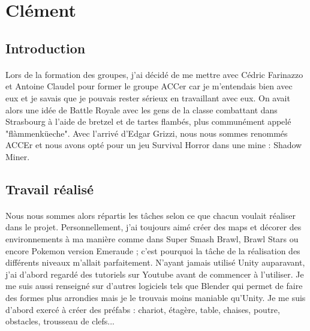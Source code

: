 \documentclass[titlepage, 13px, a4paper]{report}
\begin{document}
\newpage
\section{Clément}
\subsection{Introduction}
\paragraph*{} \hspace{0pt}
Lors de la formation des groupes, j'ai décidé de me mettre avec Cédric Farinazzo et Antoine Claudel 
pour former le groupe ACCer car je m'entendais bien avec eux et je savais que je pouvais rester 
sérieux en travaillant avec eux. On avait alors une idée de Battle Royale avec les gens de la 
classe combattant dans Strasbourg à l'aide de bretzel et de tartes flambés, plus communément 
appelé "flàmmenküeche". Avec l'arrivé d'Edgar Grizzi, nous nous sommes renommés ACCEr et nous 
avons opté pour un jeu Survival Horror dans une mine : Shadow Miner. \\

\subsection{Travail réalisé}
\paragraph*{} \hspace{0pt}
Nous nous sommes alors répartis les tâches selon ce que chacun voulait réaliser 
dans le projet. Personnellement, j'ai toujours aimé créer des maps et décorer 
des environnements à ma manière comme dans Super Smash Brawl, Brawl Stars ou encore 
Pokemon version Emeraude ; c'est pourquoi la tâche de la réalisation des différents 
niveaux m'allait parfaitement. N'ayant jamais utilisé Unity auparavant, j'ai d'abord 
regardé des tutoriels sur Youtube avant de commencer à l'utiliser. Je me suis aussi renseigné 
sur d'autres logiciels tels que Blender qui permet de faire des formes plus 
arrondies mais je le trouvais moins maniable qu'Unity. Je me suis d'abord exercé à créer des 
préfabs : chariot, étagère, table, chaises, poutre, obstacles, trousseau de clefs... \\
\end{document}
